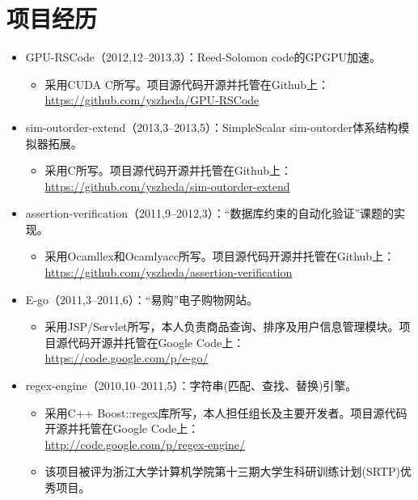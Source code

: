 \documentclass[letterpaper]{article}
\begin{document}
\section*{项目经历}
\begin{itemize}
  \item GPU-RSCode（2012,12--2013,3）：Reed-Solomon code的GPGPU加速。
	\begin{itemize}
	  \item 采用CUDA C所写。项目源代码开源并托管在Github上：\\
			  \url{https://github.com/yszheda/GPU-RSCode}
	\end{itemize}
  \item sim-outorder-extend（2013,3--2013,5）：SimpleScalar sim-outorder体系结构模拟器拓展。
	\begin{itemize}
	  \item 采用C所写。项目源代码开源并托管在Github上：\\
			  \url{https://github.com/yszheda/sim-outorder-extend}
	\end{itemize}
  \item assertion-verification（2011,9--2012,3）：``数据库约束的自动化验证''课题的实现。
	\begin{itemize}
	  \item 采用Ocamllex和Ocamlyacc所写。项目源代码开源并托管在Github上：\\
			  \url{https://github.com/yszheda/assertion-verification}
	\end{itemize}
  \item E-go（2011,3--2011,6）：``易购''电子购物网站。
	\begin{itemize}
	  \item 采用JSP/Servlet所写，本人负责商品查询、排序及用户信息管理模块。项目源代码开源并托管在Google Code上：\\
			  \url{https://code.google.com/p/e-go/}
	\end{itemize}
  \item regex-engine（2010,10--2011,5）：字符串(匹配、查找、替换)引擎。
    \begin{itemize}
	  \item 采用C++ Boost::regex库所写，本人担任组长及主要开发者。项目源代码开源并托管在Google Code上：\\
			  \url{http://code.google.com/p/regex-engine/}
      \item 该项目被评为浙江大学计算机学院第十三期大学生科研训练计划(SRTP)优秀项目。

\end{itemize}
\end{itemize}
\end{document}
